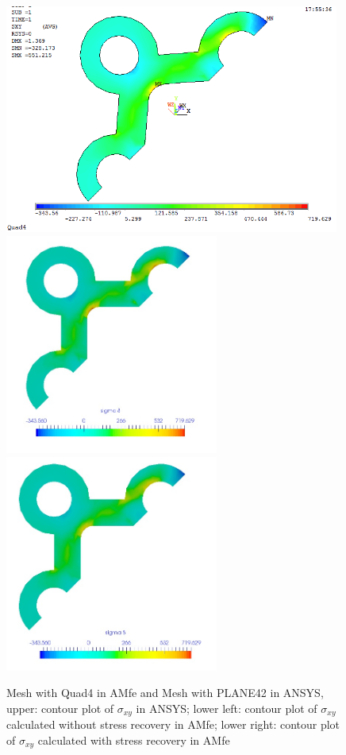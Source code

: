 \begin{figure}[htbp]
	\begin{center}
		\includegraphics[width=11cm,clip]{Quad4_Sxy.png} 	
		\includegraphics[width=7cm,clip]{Quad4_Sxy_PD.png} 	
		\includegraphics[width=7cm,clip]{Quad4_Sxy_P.png} 		
		\caption{Mesh with Quad4 in AMfe and Mesh with PLANE42 in ANSYS, upper: contour plot of $\sigma_{xy}$ in ANSYS; lower left: contour plot of $\sigma_{xy}$ calculated without stress recovery in AMfe; lower right: contour plot of $\sigma_{xy}$ calculated with stress recovery in AMfe} \label{fig: Quad4_Sxy}
	\end{center}
\end{figure}
\clearpage 

